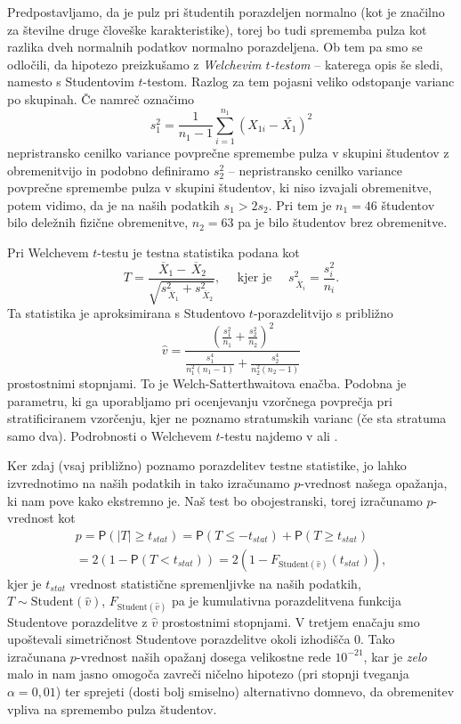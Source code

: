 \documentclass[a4paper,11pt]{article}
\newcommand{\olsi}[1]{\,\overline{\!{#1}}} %
\newcommand{\prob}{\mathsf{P}}
\begin{document}
Predpostavljamo, da je pulz pri študentih porazdeljen normalno (kot je značilno za številne druge človeške karakteristike), torej bo tudi sprememba pulza kot razlika dveh normalnih podatkov normalno porazdeljena. Ob tem pa smo se odločili, da hipotezo preizkušamo z \emph{Welchevim $t$-testom} -- katerega opis še sledi, namesto s Studentovim $t$-testom. 
Razlog za tem pojasni veliko odstopanje varianc po skupinah. Če namreč označimo
\[
    s_1^2 = \frac{1}{n_1 - 1}\sum_{i = 1}^{n_1} (X_{1i} - \bar{X_1})^2
\]
nepristransko cenilko variance povprečne spremembe pulza v skupini študentov z obremenitvijo in podobno definiramo $s_2^2$ -- nepristransko cenilko variance povprečne spremembe pulza v skupini študentov, ki niso izvajali obremenitve, potem vidimo, da je na naših podatkih $s_1 > 2s_2$. Pri tem je $n_1 = 46$ študentov bilo deležnih fizične obremenitve, $n_2 = 63$ pa je bilo študentov brez obremenitve. 

Pri Welchevem $t$-testu je testna statistika podana kot
\[
    T = \frac{\olsi{X}_1 - \olsi{X}_2}{\sqrt{s_{\olsi{X}_1}^2 + s_{\olsi{X}_2}^2}},
    \quad \text{ kjer je }\quad s^2_{\olsi{X}_i} = \frac{s^2_i}{n_i}.
\]
Ta statistika je aproksimirana s Studentovo $t$-porazdelitvijo s približno 
\[
\hat{v} = \frac{\left(\frac{s_1^2}{n_1} + \frac{s_2^2}{n_2}\right)^2}{\frac{s_1^4}{n_1^2(n_1 - 1)} + \frac{s_2^4}{n_2^2(n_2 - 1)}} 
\]
prostostnimi stopnjami. To je Welch-Satterthwaitova enačba. Podobna je parametru, ki ga uporabljamo pri ocenjevanju vzorčnega povprečja pri stratificiranem vzorčenju, kjer ne poznamo stratumskih varianc (če sta stratuma samo dva). Podrobnosti o Welchevem $t$-testu najdemo v \cite{Welch} ali \cite[\S11]{Rice}.

Ker zdaj (vsaj približno) poznamo porazdelitev testne statistike, jo lahko izvrednotimo na naših podatkih in tako izračunamo $p$-vrednost našega opažanja, ki nam pove kako ekstremno je. Naš test bo obojestranski, torej izračunamo $p$-vrednost kot
\begin{multline*}
    p = \prob(\lvert T \rvert \geq t_{stat}) = 
    \prob(T \leq -t_{stat}) + \prob(T \geq t_{stat}) \\ = 
    2(1 - \prob(T < t_{stat})) = 
    2(1 - F_{\text{Student}(\hat{v})}(t_{stat})), 
\end{multline*}
kjer je $t_{stat}$ vrednost statistične spremenljivke na naših podatkih, $T \sim \text{Student}(\hat{v})$, $F_{\text{Student}(\hat{v})}$ pa je kumulativna porazdelitvena funkcija Studentove porazdelitve z $\hat v$ prostostnimi stopnjami. V tretjem enačaju smo upoštevali simetričnost Studentove porazdelitve okoli izhodišča $0$. Tako izračunana $p$-vrednost naših opažanj dosega velikostne rede $10^{-21}$, kar je \emph{zelo} malo in nam jasno omogoča zavreči ničelno hipotezo (pri stopnji tveganja $\alpha = 0,01$) ter sprejeti (dosti bolj smiselno) alternativno domnevo, da obremenitev vpliva na spremembo pulza študentov. 
\newline
\end{document}
